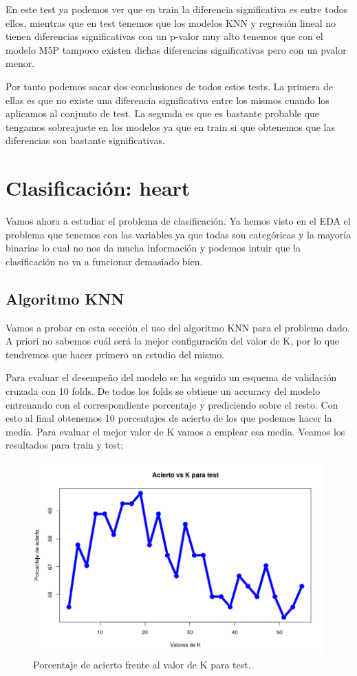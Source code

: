 \documentclass[12pt,a4paper]{article}
\begin{document}
En este test ya podemos ver que en train la diferencia significativa es entre todos ellos, mientras que en test tenemos que los modelos KNN y regresión lineal no tienen diferencias significativas con un p-valor muy alto tenemos que con el modelo M5P tampoco existen dichas diferencias significativas pero con un pvalor menor.

Por tanto podemos sacar dos conclusiones de todos estos tests. La primera de ellas es que no existe una diferencia significativa entre los mismos cuando los aplicamos al conjunto de test. La segunda es que es bastante probable que tengamos sobreajuste en los modelos ya que en train si que obtenemos que las diferencias son bastante significativas.

\section{Clasificación: heart}

Vamos ahora a estudiar el problema de clasificación. Ya hemos visto en el EDA el problema que tenemos con las variables ya que todas son categóricas y la mayoría binarias lo cual no nos da mucha información y podemos intuir que la clasificación no va a funcionar demasiado bien.

\subsection{Algoritmo KNN}

Vamos a probar en esta sección el uso del algoritmo KNN para el problema dado. A priori no sabemos cuál será la mejor configuración del valor de K, por lo que tendremos que hacer primero un estudio del mismo.

Para evaluar el desempeño del modelo se ha seguido un esquema de validación cruzada con 10 folds. De todos los folds se obtiene un accuracy del modelo entrenando con el correspondiente porcentaje y prediciendo sobre el resto. Con esto al final obtenemos 10 porcentajes de acierto de los que podemos hacer la media. Para evaluar el mejor valor de K vamos a emplear esa media. Veamos los resultados para train y test:

\begin{figure}[H]
	\centering
	\includegraphics[scale=0.6]{./Imagenes/Clasificacion/knn1.png}
	\caption{Porcentaje de acierto frente al valor de K para test.}
\end{figure}
\end{document}
